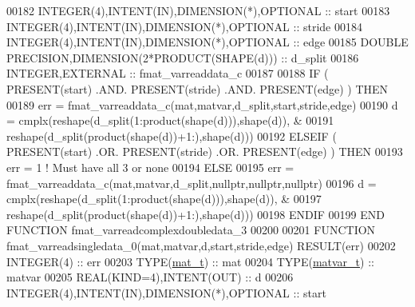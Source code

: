 \begin{DoxyCode}
00182     \textcolor{keywordtype}{INTEGER(4)},\textcolor{keywordtype}{INTENT(IN)},\textcolor{keywordtype}{DIMENSION(*)},\textcolor{keywordtype}{OPTIONAL} :: start
00183     \textcolor{keywordtype}{INTEGER(4)},\textcolor{keywordtype}{INTENT(IN)},\textcolor{keywordtype}{DIMENSION(*)},\textcolor{keywordtype}{OPTIONAL} :: stride
00184     \textcolor{keywordtype}{INTEGER(4)},\textcolor{keywordtype}{INTENT(IN)},\textcolor{keywordtype}{DIMENSION(*)},\textcolor{keywordtype}{OPTIONAL} :: edge
00185     \textcolor{keywordtype}{DOUBLE PRECISION},\textcolor{keywordtype}{DIMENSION(2*PRODUCT(SHAPE(d)))} :: d\_split
00186     \textcolor{keywordtype}{INTEGER},\textcolor{keywordtype}{EXTERNAL}                            :: fmat\_varreaddata\_c
00187 
00188     \textcolor{keywordflow}{IF} ( \textcolor{keyword}{PRESENT}(start) .AND. \textcolor{keyword}{PRESENT}(stride) .AND. \textcolor{keyword}{PRESENT}(edge) ) \textcolor{keywordflow}{THEN}
00189         err = fmat\_varreaddata\_c(mat,matvar,d\_split,start,stride,edge)
00190         d = cmplx(reshape(d\_split(1:product(shape(d))),shape(d)),         &
00191                   reshape(d\_split(product(shape(d))+1:),shape(d)))
00192     \textcolor{keywordflow}{ELSEIF} ( \textcolor{keyword}{PRESENT}(start) .OR. \textcolor{keyword}{PRESENT}(stride) .OR. \textcolor{keyword}{PRESENT}(edge) ) \textcolor{keywordflow}{THEN}
00193         err = 1    \textcolor{comment}{! Must have all 3 or none}
00194     \textcolor{keywordflow}{ELSE}
00195         err = fmat\_varreaddata\_c(mat,matvar,d\_split,nullptr,nullptr,nullptr)
00196         d = cmplx(reshape(d\_split(1:product(shape(d))),shape(d)),         &
00197                   reshape(d\_split(product(shape(d))+1:),shape(d)))
00198 \textcolor{keywordflow}{    ENDIF}
00199 \textcolor{keyword}{END FUNCTION }fmat\_varreadcomplexdoubledata\_3
00200 
00201 \textcolor{keyword}{FUNCTION }fmat\_varreadsingledata\_0(mat,matvar,d,start,stride,edge) \textcolor{keyword}{RESULT}(err)
00202     \textcolor{keywordtype}{INTEGER(4)}                                  :: err
00203     \textcolor{keywordtype}{TYPE}(\hyperlink{group___m_a_t_gab0fc888f5a5d79943b16284b1f91c2e8}{mat\_t})                                 :: mat
00204     \textcolor{keywordtype}{TYPE}(\hyperlink{group___m_a_t_structmatvar__t}{matvar\_t})                              :: matvar
00205     \textcolor{keywordtype}{REAL(KIND=4)},\textcolor{keywordtype}{INTENT(OUT)}                    :: d
00206     \textcolor{keywordtype}{INTEGER(4)},\textcolor{keywordtype}{INTENT(IN)},\textcolor{keywordtype}{DIMENSION(*)},\textcolor{keywordtype}{OPTIONAL} :: start

\end{DoxyCode}

